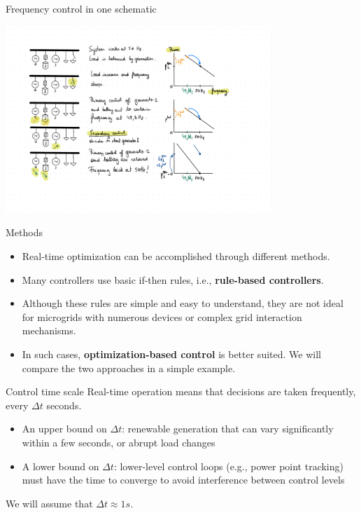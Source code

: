 \begin{frame}{Frequency control in one schematic}
    \begin{center}
        \includegraphics[width=0.75\textwidth, clip, trim=2cm 2cm 2cm 1cm]{images/primary_control.pdf}    
    \end{center}
\end{frame}

\begin{frame} {Methods}
\begin{itemize}
\item  Real-time optimization can be accomplished through different methods. 
\item Many controllers use basic if-then rules, i.e., \textbf{rule-based controllers}. 
\item Although these rules are simple and easy to understand, they are not ideal for microgrids with numerous devices or complex grid interaction mechanisms. 
\item In such cases, \textbf{optimization-based control} is better suited. We will compare the two approaches in a simple example.
\end{itemize}
\end{frame}

\begin{frame}{Control time scale}
    Real-time operation means that decisions are taken frequently, every $\Delta t$ seconds.
    \begin{itemize}
        \item An upper bound on $\Delta t$: renewable generation that can vary significantly within a few seconds, or abrupt load changes
        \item A lower bound on $\Delta t$: lower-level control loops (e.g., power point tracking) must have the time to converge to avoid interference between control levels
    \end{itemize}

    We will assume that $\Delta t \approx 1 s$.
\end{frame}

